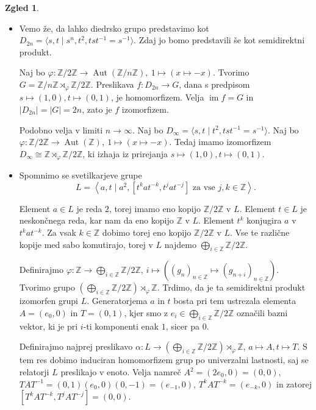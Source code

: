 \documentclass[11pt]{book}
\def\ZZ{\mathbb{Z}}
\DeclareMathOperator\image{im}
\DeclareMathOperator\Aut{Aut}
\theoremstyle{definition}
\theoremstyle{zgled}
\newtheorem*{zgled}{Zgled}
\theoremstyle{odprtproblem}
\theoremstyle{domacanaloga}
\theoremstyle{izrek}
\begin{document}
\begin{zgled}
\begin{itemize}
    \item Vemo že, da lahko diedrsko grupo predstavimo kot $D_{2n} = \langle s, t \mid s^n, t^2, t s t^{-1} = s^{-1} \rangle$. Zdaj jo bomo predstavili še kot semidirektni produkt.

    Naj bo $\varphi \colon \ZZ/2\ZZ \to \Aut(\ZZ/n\ZZ), \ 1 \mapsto (x \mapsto -x)$. Tvorimo $G = \ZZ/n\ZZ \rtimes_\varphi \ZZ/2\ZZ$. Preslikava $f \colon D_{2n} \to G$, dana s predpisom $s \mapsto (1,0), t \mapsto (0,1)$, je homomorfizem. Velja $\image f = G$ in $|D_{2n}| = |G| = 2n$, zato je $f$ izomorfizem.

    Podobno velja v limiti $n \to \infty$. Naj bo $D_{\infty} = \langle s, t \mid t^2, t s t^{-1} = s^{-1} \rangle$. Naj bo $\varphi \colon \ZZ/2\ZZ \to \Aut(\ZZ), \ 1 \mapsto (x \mapsto -x)$. Tedaj imamo izomorfizem $D_{\infty} \cong \ZZ \rtimes_\varphi \ZZ/2\ZZ$, ki izhaja iz prirejanja $s \mapsto (1,0), t \mapsto (0,1)$.

    \item Spomnimo se svetilkarjeve grupe 
    \[
    L = \left\langle a, t \mid a^2, [t^k a t^{-k}, t^j a t^{-j}] \text{ za vse $j,k \in \ZZ$} \right\rangle.
    \]

    Element $a \in L$ je reda $2$, torej imamo eno kopijo $\ZZ/2\ZZ$ v $L$.
    Element $t \in L$ je neskončnega reda, kar nam da eno kopijo $\ZZ$ v $L$. Element $t^k$ konjugira $a$ v $t^k a t^{-k}$. Za vsak $k \in \ZZ$ dobimo torej eno kopijo $\ZZ/2\ZZ$ v $L$. Vse te različne kopije med sabo komutirajo, torej v $L$ najdemo $\bigoplus_{i \in \ZZ} \ZZ/2\ZZ$.

    Definirajmo $\varphi \colon \ZZ \to \bigoplus_{i \in \ZZ} \ZZ/2\ZZ$, $i \mapsto ((g_n)_{n \in \ZZ} \mapsto (g_{n+i})_{n \in \ZZ})$. Tvorimo grupo $\left( \bigoplus_{i \in \ZZ} \ZZ/2\ZZ \right) \rtimes_{\varphi} \ZZ$. Trdimo, da je ta semidirektni produkt izomorfen grupi $L$. Generatorjema $a$ in $t$ bosta pri tem ustrezala elementa $A = (e_0, 0)$ in $T = (0, 1)$, kjer smo z $e_i \in \bigoplus_{i \in \ZZ}\ZZ/2\ZZ$ označili bazni vektor, ki je pri $i$-ti komponenti enak $1$, sicer pa $0$.

    Definirajmo najprej preslikavo $\alpha \colon L \to \left( \bigoplus_{i \in \ZZ} \ZZ/2\ZZ \right) \rtimes_{\varphi} \ZZ$, $a \mapsto A, t \mapsto T$. S tem res dobimo induciran homomorfizem grup po univerzalni lastnosti, saj se relatorji $L$ preslikajo v enoto. Velja namreč $A^2 = (2 e_0, 0) = (0,0)$, $T A T^{-1} = (0,1)(e_0,0)(0,-1) = (e_{-1},0)$, $T^k A T^{-k} = (e_{-k}, 0)$ in zatorej $[T^k A T^{-k}, T^j A T^{-j}] = (0,0)$.


\end{itemize}
\end{zgled}
\end{document}
